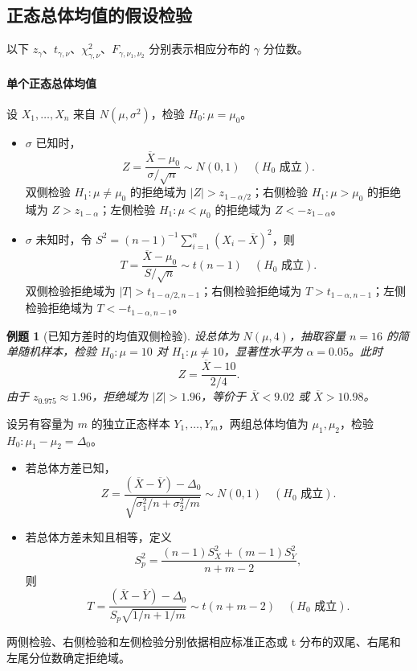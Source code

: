 \documentclass[11pt,a4paper,fontset=fandol]{ctexart}
\newtheorem{example}{例题}[section]
\theoremstyle{remark}
\begin{document}
\subsection{正态总体均值的假设检验}
以下 $z_\gamma$、$t_{\gamma,\nu}$、$\chi^2_{\gamma,\nu}$、$F_{\gamma,\nu_1,\nu_2}$ 分别表示相应分布的 $\gamma$ 分位数。

\paragraph{单个正态总体均值}
设 $X_1,\ldots,X_n$ 来自 $N(\mu,\sigma^2)$，检验 $H_0:\mu=\mu_0$。
\begin{itemize}
    \item $\sigma$ 已知时，
    \[
        Z=\frac{\overline X-\mu_0}{\sigma/\sqrt n}\sim N(0,1)
        \quad(H_0\text{ 成立}).
    \]
    双侧检验 $H_1:\mu\ne\mu_0$ 的拒绝域为 $|Z|>z_{1-\alpha/2}$；右侧检验 $H_1:\mu>\mu_0$ 的拒绝域为 $Z>z_{1-\alpha}$；左侧检验 $H_1:\mu<\mu_0$ 的拒绝域为 $Z<-z_{1-\alpha}$。
    \item $\sigma$ 未知时，令 $S^2=(n-1)^{-1}\sum_{i=1}^{n}(X_i-\overline X)^2$，则
    \[
        T=\frac{\overline X-\mu_0}{S/\sqrt n}\sim t(n-1)
        \quad(H_0\text{ 成立}).
    \]
    双侧检验拒绝域为 $|T|>t_{1-\alpha/2,n-1}$；右侧检验拒绝域为 $T>t_{1-\alpha,n-1}$；左侧检验拒绝域为 $T<-t_{1-\alpha,n-1}$。
\end{itemize}

\begin{example}[已知方差时的均值双侧检验]
设总体为 $N(\mu,4)$，抽取容量 $n=16$ 的简单随机样本，检验 $H_0:\mu=10$ 对 $H_1:\mu\ne10$，显著性水平为 $\alpha=0.05$。此时
\[
    Z=\frac{\overline X-10}{2/4}.
\]
由于 $z_{0.975}\approx1.96$，拒绝域为 $|Z|>1.96$，等价于 $\overline X<9.02$ 或 $\overline X>10.98$。
\end{example}

设另有容量为 $m$ 的独立正态样本 $Y_1,\ldots,Y_m$，两组总体均值为 $\mu_1,\mu_2$，检验 $H_0:\mu_1-\mu_2=\Delta_0$。
\begin{itemize}
    \item 若总体方差已知，
    \[
        Z=\frac{(\overline X-\overline Y)-\Delta_0}
        {\sqrt{\sigma_1^2/n+\sigma_2^2/m}}
        \sim N(0,1)
        \quad(H_0\text{ 成立}).
    \]
    \item 若总体方差未知且相等，定义
    \[
        S_p^2=\frac{(n-1)S_X^2+(m-1)S_Y^2}{n+m-2},
    \]
    则
    \[
        T=\frac{(\overline X-\overline Y)-\Delta_0}
        {S_p\sqrt{1/n+1/m}}
        \sim t(n+m-2)
        \quad(H_0\text{ 成立}).
    \]
\end{itemize}
两侧检验、右侧检验和左侧检验分别依据相应标准正态或 t 分布的双尾、右尾和左尾分位数确定拒绝域。
\end{document}

